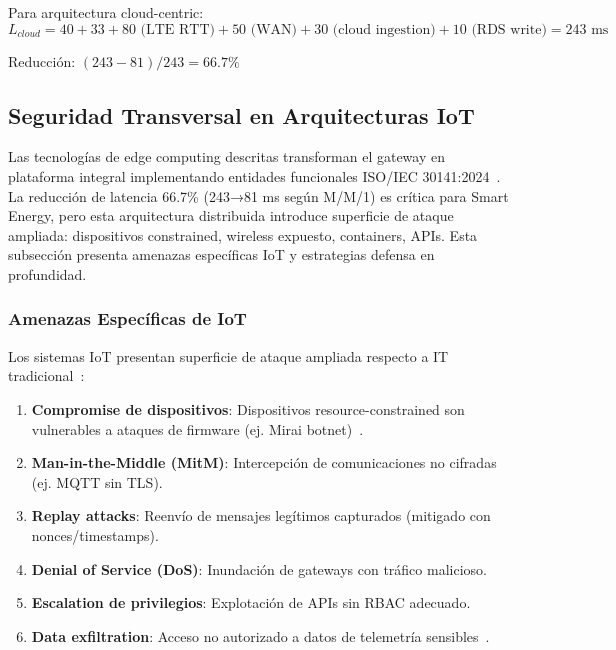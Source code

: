 Para arquitectura cloud-centric:
\begin{equation}
L_{cloud} = 40 + 33 + 80 \text{ (LTE RTT)} + 50 \text{ (WAN)} + 30 \text{ (cloud ingestion)} + 10 \text{ (RDS write)} = 243 \text{ ms}
\end{equation}

Reducción: $(243-81)/243 = 66.7\%$

\subsection{Seguridad Transversal en Arquitecturas IoT}

Las tecnologías de edge computing descritas transforman el gateway en plataforma integral implementando entidades funcionales ISO/IEC 30141:2024~\cite{ISOIEC30141v2024}. La reducción de latencia 66.7\% (243→81 ms según M/M/1) es crítica para Smart Energy, pero esta arquitectura distribuida introduce superficie de ataque ampliada: dispositivos constrained, wireless expuesto, containers, APIs. Esta subsección presenta amenazas específicas IoT y estrategias defensa en profundidad.

\subsubsection{Amenazas Específicas de IoT}

Los sistemas IoT presentan superficie de ataque ampliada respecto a IT tradicional~\cite{BlockchainBasedSecureAuthentication2025,nandalSECURITYRISKSIoT2025}:

\begin{enumerate}
\item \textbf{Compromise de dispositivos}: Dispositivos resource-constrained son vulnerables a ataques de firmware (ej. Mirai botnet)~\cite{huddaReviewWSNBased2025}.
\item \textbf{Man-in-the-Middle (MitM)}: Intercepción de comunicaciones no cifradas (ej. MQTT sin TLS).
\item \textbf{Replay attacks}: Reenvío de mensajes legítimos capturados (mitigado con nonces/timestamps).
\item \textbf{Denial of Service (DoS)}: Inundación de gateways con tráfico malicioso.
\item \textbf{Escalation de privilegios}: Explotación de APIs sin RBAC adecuado.
\item \textbf{Data exfiltration}: Acceso no autorizado a datos de telemetría sensibles~\cite{thungonSurvey6LoWPANSecurity2024,pandeyRecentLightweightCryptography2024}.
\end{enumerate}

